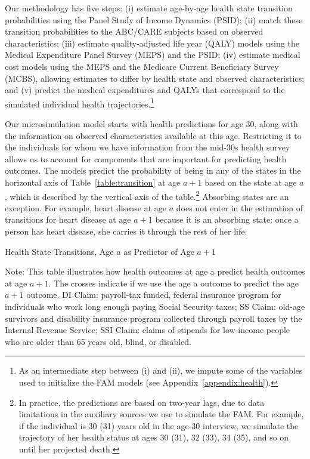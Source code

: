 Our methodology has five steps: (i) estimate age-by-age health state transition probabilities using the Panel Study of Income Dynamics (PSID); (ii) match these transition probabilities to the ABC/CARE subjects based on observed characteristics; (iii) estimate quality-adjusted life year (QALY) models using the Medical Expenditure Panel Survey (MEPS) and the PSID; (iv) estimate medical cost models using the MEPS and the Medicare Current Beneficiary Survey (MCBS), allowing estimates to differ by health state and observed characteristics; and (v) predict the medical expenditures and QALYs that correspond to the simulated individual health trajectories.\footnote{As an intermediate step between (i) and (ii), we impute some of the variables used to initialize the FAM models (see  Appendix~\ref{appendix:health}).}

Our microsimulation model starts with health predictions for age 30, along with the information on observed characteristics available at this age. Restricting it to the individuals for whom we have information from the mid-30s health survey allows us to account for components that are important for predicting health outcomes. The models predict the probability of being in any of the states in the horizontal axis of Table~\ref{table:transition} at age $a+1$ based on the state at age $a$, which is described by the vertical axis of the table.\footnote{In practice, the predictions are based on two-year lags, due to data limitations in the auxiliary sources we use to simulate the FAM. For example, if the individual is 30 (31) years old in the age-30 interview, we simulate the trajectory of her health status at ages 30 (31), 32 (33), 34 (35), and so on until her projected death.} Absorbing states are an exception. For example, heart disease at age $a$ does not enter in the estimation of transitions for heart disease at age $a+1$ because it is an absorbing state: once a person has heart disease, she carries it through the rest of her life.

\begin{table}
\begin{threeparttable}
\caption{Health State Transitions, Age $a$ as Predictor of Age $a+1$}\label{table:transition}
\tiny

\begin{tablenotes}
\footnotesize
\item Note: This table illustrates how health outcomes at age a predict health outcomes at age $a + 1$. The crosses indicate if we use the age a outcome to predict the age $a + 1$ outcome. DI Claim: payroll-tax funded, federal insurance program for individuals who work long enough paying Social Security taxes; SS Claim: old-age survivors and disability insurance program collected through payroll taxes by the Internal Revenue Service; SSI Claim: claims of stipends for low-income people who are older than 65 years old, blind, or disabled.
\end{tablenotes}
\end{threeparttable}
\end{table}

